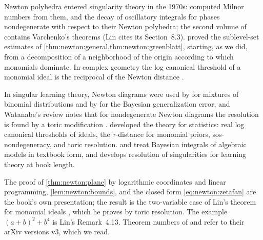 \begin{refsection}
\notesandrefs

Newton polyhedra entered singularity theory in the 1970s: \textcite{Kouchnirenko1976} computed Milnor numbers from them, and \textcite{Varchenko1976} the decay of oscillatory integrals for phases nondegenerate with respect to their Newton polyhedra; the second volume of \textcite{ArnoldEtAl1988} contains Varchenko's theorems (Lin cites its Section~8.3). \textcite{Greenblatt2010} proved the sublevel-set estimates of \cref{thm:newton:general,thm:newton:greenblatt}, starting, as we did, from a decomposition of a neighborhood of the origin according to which monomials dominate. In complex geometry the log canonical threshold of a monomial ideal is the reciprocal of the Newton distance \parencite{Howald2001}.

In singular learning theory, Newton diagrams were used by \textcite{YamazakiWatanabe2004} for mixtures of binomial distributions and by \textcite{YamazakiEtAl2010} for the Bayesian generalization error, and Watanabe's review notes that for nondegenerate Newton diagrams the resolution is found by a toric modification \parencite[Section~3]{Watanabe2024}. \textcite{Lin2011,Lin2017} developed the theory for statistics: real log canonical thresholds of ideals, the $\tau$-distance for monomial priors, sos-nondegeneracy, and toric resolution. \textcite[Chapter~5]{DrtonEtAl2009} and \textcite[Chapter~17]{Sullivant2018} treat Bayesian integrals of algebraic models in textbook form, and \textcite{Watanabe2009} develops resolution of singularities for learning theory at book length.

The proof of \cref{thm:newton:plane} by logarithmic coordinates and linear programming, \cref{lem:newton:bounds}, and the closed form \eqref{eq:newton:zetafan} are the book's own presentation; the result is the two-variable case of Lin's theorem for monomial ideals \parencite[Theorem~1.3 and Proposition~4.12]{Lin2017}, which he proves by toric resolution. The example $(a+b)^2+b^4$ is Lin's Remark~4.13. Theorem numbers of \textcite{Greenblatt2010} and \textcite{Lin2017} refer to their arXiv versions v3, which we read.


\end{refsection}
